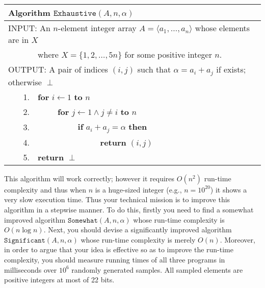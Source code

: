 \documentclass{article}
\begin{document}
\begin{table}[h]
\centering
\begin{tabular}{lrlllll}\hline
\multicolumn{7}{l}{\textsf{Algorithm} $\mathtt{Exhaustive}(A,n,\alpha)$} \\ \hline
\multicolumn{7}{l}{INPUT: An $n$-element integer array $A=\langle a_1,\ldots,a_n\rangle$ whose elements are in $X$}\\
& & \multicolumn{5}{l}{where $X=\{1,2,\ldots,5n\}$ for some positive integer $n$.}\\
\multicolumn{7}{l}{OUTPUT: A pair of indices $(i,j)$ such that $\alpha=a_i+a_j$ if exists; otherwise $\perp$} \\ 
&1. & \multicolumn{5}{l}{\textbf{for} $i\gets 1$ \textbf{to} $n$}\\
&2. & & \multicolumn{4}{l}{\textbf{for} $j\gets 1\wedge j\neq i$ \textbf{to} $n$}\\
&  3. &  & &\multicolumn{3}{l}{\textbf{if} $a_i+a_j=\alpha$ \textbf{then}}\\
&  4. &  & & & \multicolumn{2}{l}{\textbf{return} $(i,j)$}\\
&5. &  \multicolumn{5}{l}{\textbf{return} $\perp$}\\\hline
\end{tabular}
\end{table}

This algorithm will work correctly; however it requires $O(n^2)$ run-time complexity and thus 
when $n$ is a huge-sized integer (e.g., $n=10^{20}$) it shows a very slow execution time.
Thus your technical mission is to improve this algorithm in a stepwise manner.
To do this, firstly you need to  find a somewhat improved algorithm $\mathtt{Somewhat}(A,n,\alpha)$ whose run-time 
complexity is $O(n\log n)$. Next, you should devise a significantly improved algorithm 
$\mathtt{Significant}(A,n,\alpha)$ whose run-time complexity is merely $O(n)$.
Moreover, in order to argue that your idea is effective so as to improve the run-time complexity,
you should measure running times of all three programs in milliseconds over $10^{6}$ randomly generated samples.
All sampled elements are positive integers at most of 22 bits.
\end{document}

